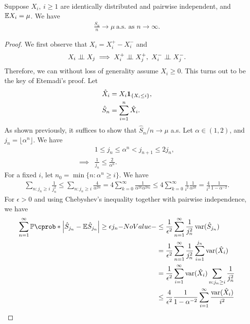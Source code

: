\documentclass[12pt]{article}
\begin{document}
\begin{Theorem}
Suppose $X_i,\ i \geq 1$ are identically distributed and pairwise independent, and $\E X_i = \mu$. We have
\begin{align*}
\frac{S_n}{n} \to \mu \ \text{a.s. as $n\to\infty$}.
\end{align*}
\end{Theorem}
\begin{proof}
We first observe that $X_i = X_i^+ - X_i^-$ and
\begin{align*}
X_i \independent X_j \implies 
X_i^+ \independent X_j^+,\ X_i^- \independent X_j^-.
\end{align*}
Therefore, we can without loss of generality assume $X_i \geq 0$. This turns out to be the key of Etemadi's proof. Let
\begin{align*}
\hat{X}_i &= X_i {\bf 1}_{\{X_i \leq i\}}, \\
\hat{S}_n &= \sum_{i = 1}^n \hat{X}_i.
\end{align*}
As shown previously, it suffices to show that $\hat{S}_n/n \to \mu$ a.s. Let $\alpha \in (1, 2)$, and $j_n = \lfloor \alpha^n \rfloor$. We have
\begin{align*}
&1 \leq j_n \leq \alpha^n < j_{n+1} \leq 2 j_n, \\
\implies
&\frac{1}{j_n} \leq \frac{2}{\alpha^n}.
\end{align*}
For a fixed $i$, let $n_0 = \min \{n:\alpha^n \geq i\}$. We have
\begin{align}
\sum_{n: j_n \geq i} \frac{1}{j_n^2} 
\leq \sum_{n: j_n \geq i} \frac{4}{\alpha^{2n}} 
= 4 \sum_{k=0}^{\infty} \frac{1}{\alpha^{2k} \alpha^{2 n_0}}
\leq 4 \sum_{k=0}^{\infty} \frac{1}{i^2} \frac{1}{\alpha^{2k}}
= \frac{4}{i^2} \frac{1}{1 - \alpha^{-2}}. \label{ineq:sumjn}
\end{align}
For $\epsilon > 0$ and using Chebyshev's inequality together with pairwise independence, we have
\begin{align*}
\sum_{n=1}^{\infty} \P(\left| \hat{S}_{j_n} - \E \hat{S}_{j_n} \right| \geq \epsilon j_n)
&\leq \frac{1}{\epsilon^2} \sum_{n=1}^{\infty} \frac{1}{j_n^2} \var(\hat{S}_{j_n}) \\
&= \frac{1}{\epsilon^2} \sum_{n=1}^{\infty} \frac{1}{j_n^2} \sum_{i=1}^{j_n} \var(\hat{X}_i) \\
&= \frac{1}{\epsilon^2} \sum_{i=1}^{\infty} \var(\hat{X}_i) \sum_{n:j_n \geq i} \frac{1}{j_n^2} \\
&\leq \frac{4}{\epsilon^2} \frac{1}{1 - \alpha^{-2}} \sum_{i=1}^{\infty} \frac{\var(\hat{X}_i)}{i^2} \\

\end{align*}
\end{proof}
\end{document}
